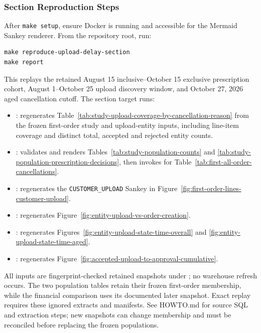 \clearpage
\subsubsection{Section Reproduction Steps}\label{subsubsec:reproduce-upload-delays}
After \texttt{make setup}, ensure Docker is running and accessible for the
Mermaid Sankey renderer. From the repository root, run:
\begin{lstlisting}[basicstyle=\ttfamily\small,breaklines=true]
make reproduce-upload-delay-section
make report
\end{lstlisting}
This replays the retained August 15 inclusive--October 15 exclusive prescription
cohort, August 1--October 25 upload discovery window, and October 27, 2026 aged
cancellation cutoff. The section target runs:
\begin{itemize}[leftmargin=*]
\item {}: regenerates
Table~\ref{tab:study-upload-coverage-by-cancellation-reason} from the frozen
first-order study and upload-entity inputs, including line-item coverage and
distinct total, accepted and rejected entity counts.
\item {}: validates and renders
Tables~\ref{tab:study-population-counts} and
\ref{tab:study-population-prescription-decisions}, then invokes
 for
Table~\ref{tab:first-all-order-cancellations}.
\item {}: regenerates the
\texttt{CUSTOMER\_UPLOAD} Sankey in Figure~\ref{fig:first-order-lines-customer-upload}.
\item {}: regenerates
Figure~\ref{fig:entity-upload-vs-order-creation}.
\item {}: regenerates
Figures~\ref{fig:entity-upload-state-time-overall} and
\ref{fig:entity-upload-state-time-aged}.
\item {}: regenerates
Figure~\ref{fig:accepted-upload-to-approval-cumulative}.
\end{itemize}
All inputs are fingerprint-checked retained snapshots under ; no
warehouse refresh occurs. The two population tables retain their frozen
first-order membership, while the financial comparison uses its documented
later snapshot. Exact replay requires these ignored extracts and manifests.
See HOWTO.md for source SQL and extraction steps; new snapshots can change
membership and must be reconciled before replacing the frozen populations.
